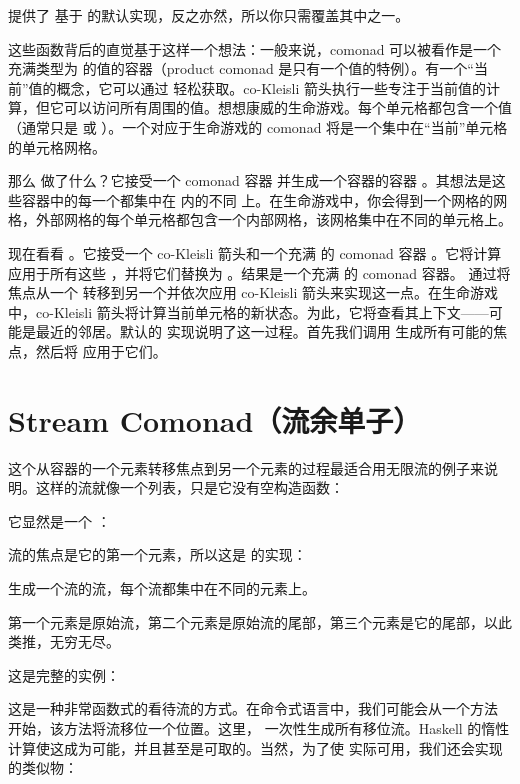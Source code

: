 提供了  基于  的默认实现，反之亦然，所以你只需覆盖其中之一。

这些函数背后的直觉基于这样一个想法：一般来说，comonad 可以被看作是一个充满类型为  的值的容器（product comonad 是只有一个值的特例）。有一个“当前”值的概念，它可以通过  轻松获取。co-Kleisli 箭头执行一些专注于当前值的计算，但它可以访问所有周围的值。想想康威的生命游戏。每个单元格都包含一个值（通常只是  或 ）。一个对应于生命游戏的 comonad 将是一个集中在“当前”单元格的单元格网格。

那么  做了什么？它接受一个 comonad 容器  并生成一个容器的容器 。其想法是这些容器中的每一个都集中在  内的不同  上。在生命游戏中，你会得到一个网格的网格，外部网格的每个单元格都包含一个内部网格，该网格集中在不同的单元格上。

现在看看 。它接受一个 co-Kleisli 箭头和一个充满  的 comonad 容器 。它将计算应用于所有这些 ，并将它们替换为 。结果是一个充满  的 comonad 容器。 通过将焦点从一个  转移到另一个并依次应用 co-Kleisli 箭头来实现这一点。在生命游戏中，co-Kleisli 箭头将计算当前单元格的新状态。为此，它将查看其上下文——可能是最近的邻居。默认的  实现说明了这一过程。首先我们调用  生成所有可能的焦点，然后将  应用于它们。

\section{Stream Comonad（流余单子）}

这个从容器的一个元素转移焦点到另一个元素的过程最适合用无限流的例子来说明。这样的流就像一个列表，只是它没有空构造函数：

它显然是一个 ：

流的焦点是它的第一个元素，所以这是  的实现：

 生成一个流的流，每个流都集中在不同的元素上。

第一个元素是原始流，第二个元素是原始流的尾部，第三个元素是它的尾部，以此类推，无穷无尽。

这是完整的实例：

这是一种非常函数式的看待流的方式。在命令式语言中，我们可能会从一个方法  开始，该方法将流移位一个位置。这里， 一次性生成所有移位流。Haskell 的惰性计算使这成为可能，并且甚至是可取的。当然，为了使  实际可用，我们还会实现  的类似物：

